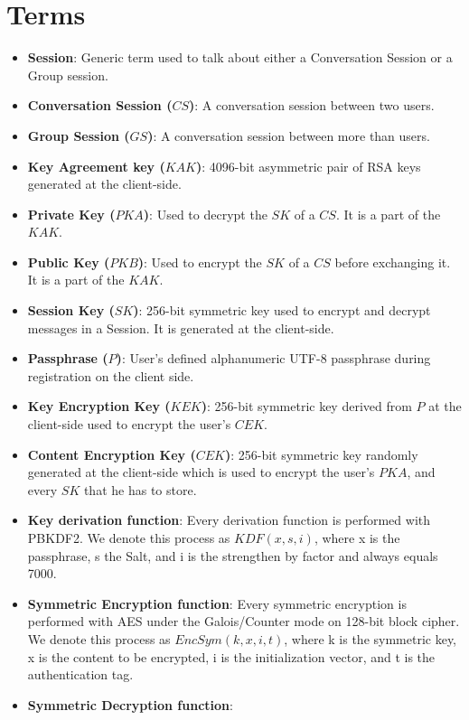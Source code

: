\documentclass[a4paper,10pt]{article}
\begin{document}
\section{Terms}
\begin{itemize}
    \item \textbf{Session}:
    Generic term used to talk about either a Conversation Session or a Group session.
    \item \textbf{Conversation Session ($CS$)}:
    A conversation session between two users.
    \item \textbf{Group Session ($GS$)}:
    A conversation session between more than users.
    \item \textbf{Key Agreement key ($KAK$)}:
    4096-bit asymmetric pair of RSA keys generated at the client-side.
    \item \textbf{Private Key ($PKA$)}:
    Used to decrypt the $SK$ of a $CS$. It is a part of the $KAK$.
    \item \textbf{Public Key ($PKB$)}:
    Used to encrypt the $SK$ of a $CS$ before exchanging it. It is a part of the $KAK$.
    \item \textbf{Session Key ($SK$)}:
    256-bit symmetric key used to encrypt and decrypt messages in a Session. It is generated at the client-side.
    \item \textbf{Passphrase ($P$)}:
    User's defined alphanumeric UTF-8 passphrase during registration on the client side.
    \item \textbf{Key Encryption Key ($KEK$)}:
    256-bit symmetric key derived from $P$ at the client-side used to encrypt the user's $CEK$.
    \item \textbf{Content Encryption Key ($CEK$)}:
    256-bit symmetric key randomly generated at the client-side which is used to encrypt the user's $PKA$, and every $SK$ that he has to store.
    \item \textbf{Key derivation function}:
    Every derivation function is performed with PBKDF2. We denote this process as $KDF(x, s, i)$, where x is the passphrase, s the Salt, and i is the strengthen by factor and always equals 7000.
    \item \textbf{Symmetric Encryption function}:
    Every symmetric encryption is performed with AES under the Galois/Counter mode on 128-bit block cipher. We denote this process as $EncSym(k, x, i, t)$, where k is the symmetric key, x is the content to be encrypted, i is the initialization vector, and t is the authentication tag.
    \item \textbf{Symmetric Decryption function}:

\end{itemize}
\end{document}
